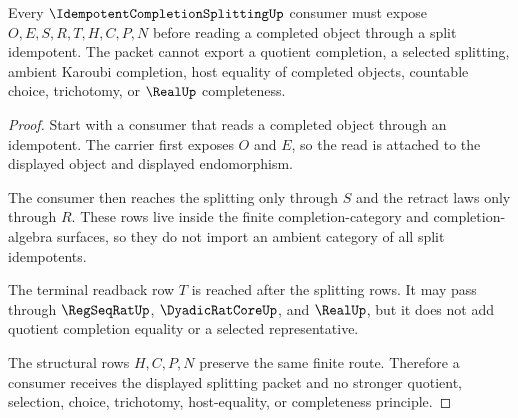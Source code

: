 \begin{theorem}
\label{thm:idempotent-completion-splitting-nonescape}
Every $\IdempotentCompletionSplittingUp$ consumer must expose $O,E,S,R,T,H,C,P,N$ before reading a completed object through a split idempotent. The packet cannot export a quotient completion, a selected splitting, ambient Karoubi completion, host equality of completed objects, countable choice, trichotomy, or $\RealUp$ completeness.
\end{theorem}
\begin{proof}
Start with a consumer that reads a completed object through an idempotent. The carrier first exposes $O$ and $E$, so the read is attached to the displayed object and displayed endomorphism.

The consumer then reaches the splitting only through $S$ and the retract laws only through $R$. These rows live inside the finite completion-category and completion-algebra surfaces, so they do not import an ambient category of all split idempotents.

The terminal readback row $T$ is reached after the splitting rows. It may pass through $\RegSeqRatUp$, $\DyadicRatCoreUp$, and $\RealUp$, but it does not add quotient completion equality or a selected representative.

The structural rows $H,C,P,N$ preserve the same finite route. Therefore a consumer receives the displayed splitting packet and no stronger quotient, selection, choice, trichotomy, host-equality, or completeness principle.
\end{proof}




